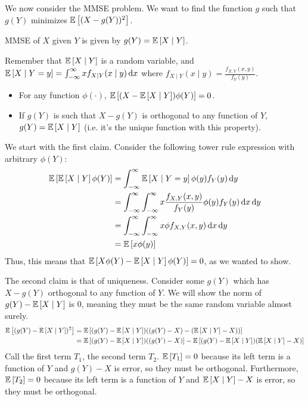 We now consider the MMSE problem. We want to find the function $g$ such that $g(Y)$ minimizes $\mathbb{E}\left[ (X - g(Y))^2 \right]$.

\begin{theorem}[MMSE]
    MMSE of $X$ given $Y$ is given by $g(Y) = \mathbb{E}\left[ X \mid Y \right]$.
\end{theorem}

Remember that $\mathbb{E}\left[ X \mid Y \right]$ is a random variable, and $\mathbb{E}\left[ X \mid Y = y \right] = \int_{-\infty}^{\infty} x f_{X \mid Y}(x \mid y) \dd{x}$
where $f_{X \mid Y} (x \mid y) = \frac{f_{X, Y}(x, y)}{f_Y(y)}$.

\begin{theorem}
    \begin{itemize}
        \item For any function $\phi(\cdot)$, $\mathbb{E}\left[ (X - \mathbb{E}\left[ X \mid Y \right]) \phi(Y) \right] = 0$. 
        \item If $g(Y)$ is such that $X - g(Y)$ is orthogonal to any function of $Y$, $g(Y) = \mathbb{E}\left[ X \mid Y \right]$ (i.e. it's the unique function with this property).
    \end{itemize}

    \begin{proof*}
        We start with the first claim. Consider the following tower rule expression with arbitrary $\phi(Y)$:
        \begin{align*}
            \mathbb{E}\left[ \mathbb{E}\left[ X \mid Y \right] \phi(Y) \right] &= \int_{-\infty}^{\infty} \mathbb{E}\left[ X \mid Y = y \right] \phi(y) f_Y(y) \dd{y} \\
            &= \int_{-\infty}^{\infty} \int_{-\infty}^{\infty} x \frac{f_{X, Y}(x, y)}{f_Y(y)} \phi(y) f_Y(y) \dd{x} \dd{y} \\
            &= \int_{-\infty}^{\infty} \int_{-\infty}^{\infty} x \phi f_{X, Y}(x, y) \dd{x} \dd{y} \\
            &= \mathbb{E}\left[ x \phi(y) \right]
        \end{align*}
        Thus, this means that $\mathbb{E}\left[ X \phi(Y) - \mathbb{E}\left[ X \mid Y \right] \phi(Y) \right] = 0$, as we wanted to show.

        The second claim is that of uniqueness. Consider some $g(Y)$ which has $X - g(Y)$ orthogonal to any function of $Y$. We will show the norm of $g(Y) - \mathbb{E}\left[ X \mid Y \right]$ is $0$, meaning they must be the same random variable almost surely.
        \begin{align*}
            \mathbb{E}\left[ (g(Y) - \mathbb{E}\left[ X \mid Y \right])^2 \right] &= \mathbb{E}\left[ (g(Y) - \mathbb{E}\left[ X \mid Y \right])((g(Y) - X) - (\mathbb{E}\left[ X \mid Y \right] - X)) \right] \\
            &= \mathbb{E}\left[ (g(Y) - \mathbb{E}\left[ X \mid Y \right])((g(Y) - X) \right] - \mathbb{E}\left[ (g(Y) - \mathbb{E}\left[ X \mid Y \right])(\mathbb{E}\left[ X \mid Y \right] - X) \right]
        \end{align*}
        Call the first term $T_1$, the second term $T_2$. $\mathbb{E}\left[ T_1 \right] = 0$ because its left term is a function of $Y$ and $g(Y) - X$ is error, so they must be orthogonal.
        Furthermore, $\mathbb{E}\left[ T_2 \right] = 0$ because its left term is a function of $Y$ and $\mathbb{E}\left[ X \mid Y \right] - X$ is error, so they must be orthogonal.
    \end{proof*}
\end{theorem}

